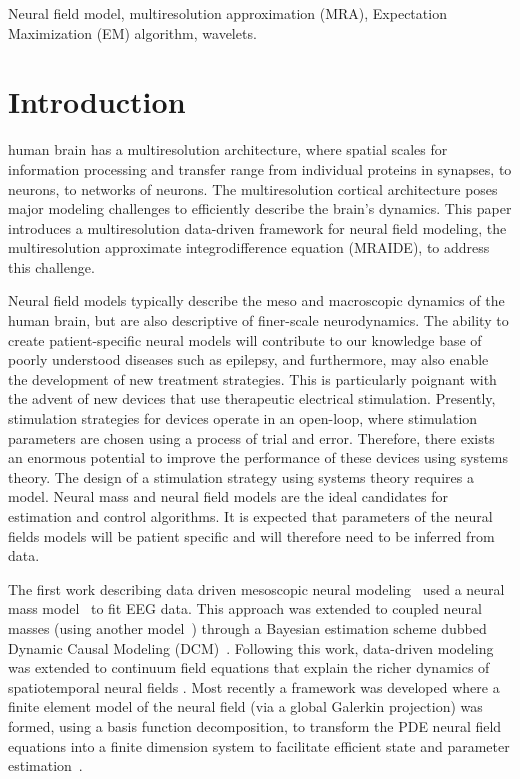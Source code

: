 \documentclass[journal,a4paper]{IEEEtran}
\begin{document}
\begin{IEEEkeywords}
Neural field model, multiresolution approximation (MRA), Expectation Maximization (EM) algorithm, wavelets.
\end{IEEEkeywords}

\IEEEpeerreviewmaketitle

\section{Introduction}
 human brain has a multiresolution architecture, where spatial scales for information processing and transfer range from individual proteins in synapses, to neurons, to networks of neurons. The multiresolution cortical architecture poses major modeling challenges to efficiently describe the brain's dynamics. This paper introduces a multiresolution data-driven framework for neural field modeling, the multiresolution approximate integrodifference equation (MRAIDE), to address this challenge. 

Neural field models typically describe the meso and macroscopic dynamics of the human brain, but are also descriptive of finer-scale neurodynamics. The ability to create patient-specific neural models will contribute to our knowledge base of poorly understood diseases such as epilepsy, and furthermore, may also enable the development of new treatment strategies. This is particularly poignant with the advent of new devices that use therapeutic electrical stimulation. Presently, stimulation strategies for devices operate in an open-loop, where stimulation parameters are chosen using a process of trial and error. Therefore, there exists an enormous potential to improve the performance of these devices using systems theory. The design of a stimulation strategy using systems theory requires a model. Neural mass and neural field models are the ideal candidates for estimation and control algorithms. It is expected that parameters of the neural fields models will be patient specific and will therefore need to be inferred from data.

The first work describing data driven mesoscopic neural modeling~\cite{Valdes1999} used a neural mass model~\cite{LopesDaSilva1976,Zetterberg1978} to fit EEG data. This approach was extended to coupled neural masses (using another model~\cite{Jansen1995}) through a Bayesian estimation scheme dubbed Dynamic Causal Modeling (DCM)~\cite{David2003}. Following this work, data-driven modeling was extended to continuum field equations that explain the richer dynamics of spatiotemporal neural fields \cite{Galka2008,schiff2008kalman,Daunizeau2009}. Most recently a framework was developed where a finite element model of the neural field (via a global Galerkin projection) was formed, using a basis function decomposition, to transform the PDE neural field equations into a finite dimension system to facilitate efficient state and parameter estimation~\cite{Freestone2011}.  
\end{document}
